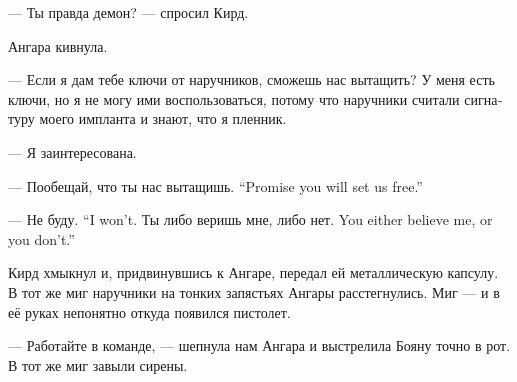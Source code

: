 \documentclass[a4paper,12pt,fleqn]{book}\usepackage{polyglossia}\setdefaultlanguage[babelshorthands=true]{russian}\setotherlanguage{english}\defaultfontfeatures{Ligatures=TeX,Mapping=tex-text}
\begin{document}
--- Ты правда демон? --- спросил Кирд.

Ангара кивнула.

--- Если я дам тебе ключи от наручников, сможешь нас вытащить?
У меня есть ключи, но я не могу ими воспользоваться, потому что наручники считали сигнатуру моего импланта и знают, что я пленник.

--- Я заинтересована.

{--- Пообещай, что ты нас вытащишь.}
{``Promise you will set us free.''}

{--- Не буду.}
{``I won't.}
{Ты либо веришь мне, либо нет.}
{You either believe me, or you don't.''}

Кирд хмыкнул и, придвинувшись к Ангаре, передал ей металлическую капсулу.
В тот же миг наручники на тонких запястьях Ангары расстегнулись.
Миг --- и в её руках непонятно откуда появился пистолет.

--- Работайте в команде, --- шепнула нам Ангара и выстрелила Бояну точно в рот.
В тот же миг завыли сирены.
\end{document}
